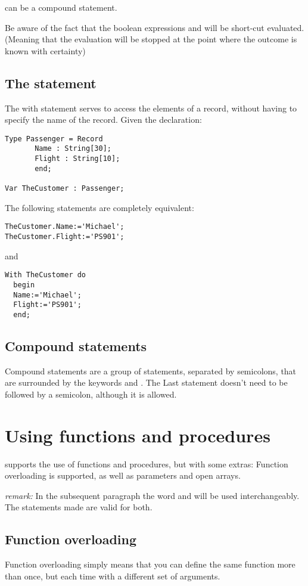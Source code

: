\documentclass{report}
\begin{document}
 can be a compound statement.

Be aware of the fact that the boolean expressions  and
 will be short-cut evaluated. (Meaning that the evaluation
will be stopped at the point where the outcome is known with certainty)

\subsection{The  statement}
The with statement serves to access the elements of a record, without
having to specify the name of the record. Given the declaration:
\begin{verbatim}
Type Passenger = Record
       Name : String[30];
       Flight : String[10];
       end;

Var TheCustomer : Passenger;
\end{verbatim}
The following statements are completely equivalent:
\begin{verbatim}
TheCustomer.Name:='Michael';
TheCustomer.Flight:='PS901';
\end{verbatim}
and
\begin{verbatim}
With TheCustomer do
  begin
  Name:='Michael';
  Flight:='PS901';
  end;
\end{verbatim}
 
\subsection{Compound statements}
Compound statements are a group of statements, separated by semicolons, 
that are surrounded by the keywords  and . The
Last statement doesn't need to be followed by a semicolon, although it is
allowed.

\section{Using functions and procedures}
\fpk supports the use of functions and procedures, but with some extras:
Function overloading is supported, as well as  parameters and
open arrays.

{\em remark:} In the subsequent paragraph the word  and
 will be used interchangeably. The statements made are
valid for both.

\subsection{Function overloading}
Function overloading simply means that you can define the same function more
than once, but each time with a different set of arguments.
\end{document}
